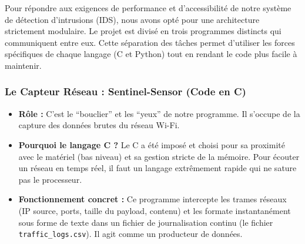 \documentclass[a4paper, 12pt, twoside]{article}
\begin{document}
Pour répondre aux exigences de performance et d'accessibilité de notre système de détection d'intrusions (IDS), nous avons opté pour une architecture strictement modulaire. Le projet est divisé en trois programmes distincts qui communiquent entre eux. Cette séparation des tâches permet d'utiliser les forces spécifiques de chaque langage (C et Python) tout en rendant le code plus facile à maintenir.

\subsubsection*{Le Capteur Réseau : Sentinel-Sensor (Code en C)}
\begin{itemize}
    \item \textbf{Rôle :} C'est le ``bouclier'' et les ``yeux'' de notre programme. Il s'occupe de la capture des données brutes du réseau Wi-Fi.
    \item \textbf{Pourquoi le langage C ?} Le C a été imposé et choisi pour sa proximité avec le matériel (bas niveau) et sa gestion stricte de la mémoire. Pour écouter un réseau en temps réel, il faut un langage extrêmement rapide qui ne sature pas le processeur.
    \item \textbf{Fonctionnement concret :} Ce programme intercepte les trames réseaux (IP source, ports, taille du payload, contenu) et les formate instantanément sous forme de texte dans un fichier de journalisation continu (le fichier \texttt{traffic\_logs.csv}). Il agit comme un producteur de données.
\end{itemize}
\end{document}
